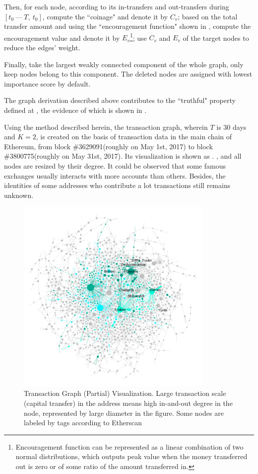 Then, for each node, according to its in-transfers and out-transfers during $[t_0\ —\ T,\ t_0]$, compute the ``coinage" and denote it by $C_v$; based on the total transfer amount and using the ``encouragement function" shown in , compute the encouragement value and denote it by $E_v$\footnote{Encouragement function can be represented as a linear combination of two normal distributions, which outputs peak value when the money transferred out is zero or of some ratio of the amount transferred in.}; use $C_v$ and $E_v$ of the target nodes to reduce the edges' weight.

Finally, take the largest weakly connected component of the whole graph, only keep nodes belong to this component. The deleted nodes are assigned with lowest importance score by default.

The graph derivation described above contributes to the ``truthful" property defined at , the evidence of which is shown in .

Using the method described herein, the transaction graph, wherein $T$ is 30 days and $K=2$, is created on the basis of transaction data in the main chain of Ethereum, from block \#3629091(roughly on May 1st, 2017) to block \#3800775(roughly on May 31st, 2017). Its visualization is shown as . , and all nodes are resized by their degree. It could be observed that some famous exchanges usually interacts with more accounts than others. Besides, the identities of some addresses who contribute a lot transactions still remains unknown.

\begin{figure}[htbp]
	\centering
	\includegraphics[width=0.85\textwidth]{figs/wgc1.png}
	\caption{Transaction Graph (Partial) Visualization. \small{Large transaction scale (capital transfer) in the address means high in-and-out degree in the node, represented by large diameter in the figure. Some nodes are labeled by tags according to Etherscan\cite{etherscan}}  }\label{fig:wgc}
\end{figure}

